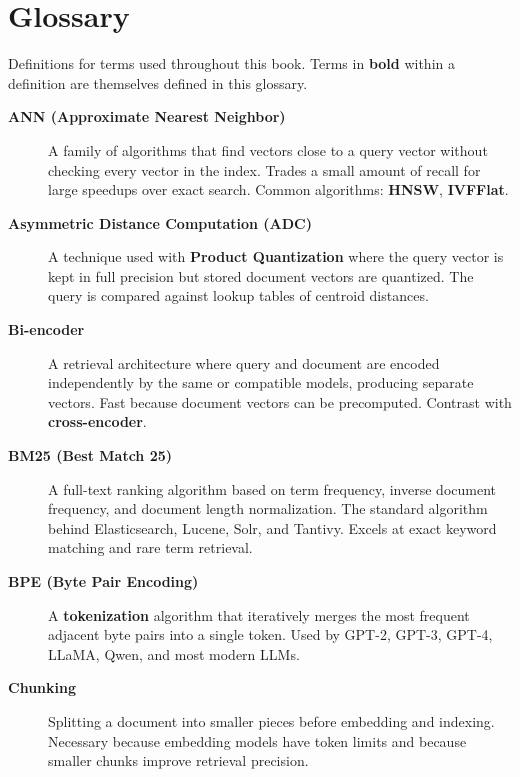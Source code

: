 \chapter*{Glossary}

Definitions for terms used throughout this book. Terms in \textbf{bold} within a definition
are themselves defined in this glossary.

\begin{description}

\item[\textbf{ANN (Approximate Nearest Neighbor)}]
A family of algorithms that find vectors close to a query vector without checking every vector
in the index. Trades a small amount of recall for large speedups over exact search. Common
algorithms: \textbf{HNSW}, \textbf{IVFFlat}.

\item[\textbf{Asymmetric Distance Computation (ADC)}]
A technique used with \textbf{Product Quantization} where the query vector is kept in full
precision but stored document vectors are quantized. The query is compared against lookup
tables of centroid distances.

\item[\textbf{Bi-encoder}]
A retrieval architecture where query and document are encoded independently by the same or
compatible models, producing separate vectors. Fast because document vectors can be precomputed.
Contrast with \textbf{cross-encoder}.

\item[\textbf{BM25 (Best Match 25)}]
A full-text ranking algorithm based on term frequency, inverse document frequency, and
document length normalization. The standard algorithm behind Elasticsearch, Lucene, Solr, and
Tantivy. Excels at exact keyword matching and rare term retrieval.

\item[\textbf{BPE (Byte Pair Encoding)}]
A \textbf{tokenization} algorithm that iteratively merges the most frequent adjacent byte
pairs into a single token. Used by GPT-2, GPT-3, GPT-4, LLaMA, Qwen, and most modern LLMs.

\item[\textbf{Chunking}]
Splitting a document into smaller pieces before embedding and indexing. Necessary because
embedding models have token limits and because smaller chunks improve retrieval precision.


\end{description}
